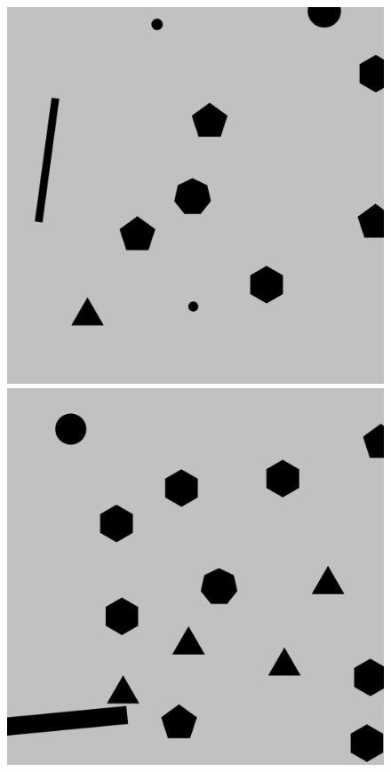 \documentclass{beamer}
\begin{document}
\begin{frame}
\begin{figure}[H]
\begin{columns}
\begin{column}{0.14\textwidth}
							\includegraphics[width=1\linewidth]{graphics/test_model_11_complex_1.png}
							\includegraphics[width=1\linewidth]{graphics/test_model_15_complex_1.png}
						\end{column}
					\end{columns}
				\end{figure}
			\end{frame}
\end{document}

